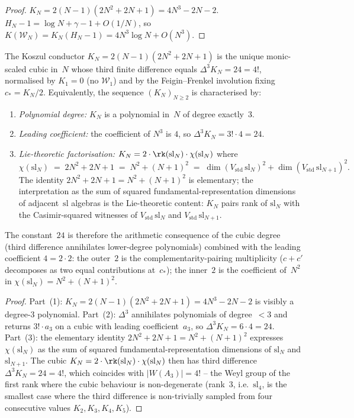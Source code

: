 \begin{proof}
$K_N = 2(N-1)(2N^2+2N+1) = 4N^3 - 2N - 2$.
$H_N - 1 = \log N + \gamma - 1 + O(1/N)$, so
$K(\mathcal{W}_N) = K_N(H_N - 1) = 4N^3 \log N + O(N^3)$.
\end{proof}

\begin{theorem}
\label{thm:koszul-conductor-cubic-rigidity}
The Koszul conductor $K_N = 2(N-1)(2N^2+2N+1)$ is the unique
monic-scaled cubic in~$N$ whose third finite difference equals
$\Delta^3 K_N = 24 = 4!$, normalised by $K_1 = 0$ (no $\mathcal{W}_1$)
and by the Feigin--Frenkel involution fixing $c_* = K_N/2$.
Equivalently, the sequence $(K_N)_{N \ge 2}$
is characterised by:
\begin{enumerate}
\item \emph{Polynomial degree:} $K_N$ is a polynomial in~$N$ of
degree exactly~$3$.
\item \emph{Leading coefficient:} the coefficient of $N^3$ is $4$,
so $\Delta^3 K_N = 3! \cdot 4 = 24$.
\item \emph{Lie-theoretic factorisation:}
$K_N = 2 \cdot \rk(\mathrm{sl}_N) \cdot \chi(\mathrm{sl}_N)$ where
\[
\chi(\mathrm{sl}_N) \;=\; 2N^2 + 2N + 1
\;=\; N^2 + (N+1)^2
\;=\; \dim(V_{\mathrm{std}}\, \mathrm{sl}_N)^2
 + \dim(V_{\mathrm{std}}\, \mathrm{sl}_{N+1})^2.
\]
The identity $2N^2+2N+1 = N^2+(N+1)^2$ is elementary; the
interpretation as the sum of squared fundamental-representation
dimensions of adjacent~$\mathrm{sl}$ algebras is the Lie-theoretic
content: $K_N$ pairs rank of $\mathrm{sl}_N$ with the Casimir-squared
witnesses of $V_{\mathrm{std}}\,\mathrm{sl}_N$ and
$V_{\mathrm{std}}\,\mathrm{sl}_{N+1}$.
\end{enumerate}
The constant~$24$ is therefore the arithmetic consequence of the
cubic degree (third difference annihilates lower-degree polynomials)
combined with the leading coefficient $4 = 2 \cdot 2$: the outer~$2$
is the complementarity-pairing multiplicity ($c + c'$ decomposes as
two equal contributions at~$c_*$); the inner~$2$ is the coefficient
of~$N^2$ in $\chi(\mathrm{sl}_N) = N^2 + (N+1)^2$.
\end{theorem}

\begin{proof}
Part~(1): $K_N = 2(N-1)(2N^2+2N+1) = 4N^3 - 2N - 2$ is visibly a
degree-$3$ polynomial. Part~(2): $\Delta^3$ annihilates polynomials
of degree~$<3$ and returns $3! \cdot a_3$ on a cubic with leading
coefficient~$a_3$, so $\Delta^3 K_N = 6 \cdot 4 = 24$. Part~(3): the
elementary identity $2N^2+2N+1 = N^2+(N+1)^2$ expresses
$\chi(\mathrm{sl}_N)$ as the sum of squared fundamental-representation
dimensions of $\mathrm{sl}_N$ and $\mathrm{sl}_{N+1}$. The cubic
$K_N = 2 \cdot \rk(\mathrm{sl}_N) \cdot \chi(\mathrm{sl}_N)$ then has
third difference $\Delta^3 K_N = 24 = 4!$,
which coincides with $|W(A_3)| = 4!$ -- the Weyl group of the first
rank where the cubic behaviour is non-degenerate (rank~$3$,
i.e.~$\mathrm{sl}_4$, is the smallest case where the third
difference is non-trivially sampled from four consecutive values
$K_2, K_3, K_4, K_5$).
\end{proof}

